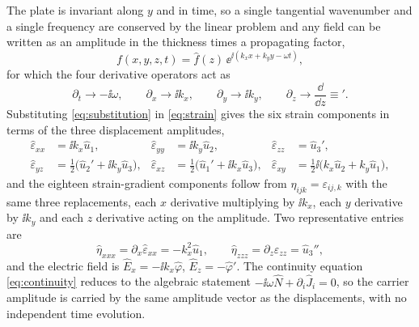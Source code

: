 The plate is invariant along $y$ and in time, so a single tangential wavenumber
and a single frequency are conserved by the linear problem and any field can be written as an amplitude in the thickness times a propagating factor,
\begin{equation}
\label{eq:ansatz}
f(x,y,z,t)=\widehat f(z)\,\ee^{\ii(k_xx+k_yy-\omega t)} ,
\end{equation}
for which the four derivative operators act as
\begin{equation}
\label{eq:substitution}
\partial_t\to-\ii\omega,\qquad
\partial_x\to\ii k_x,\qquad
\partial_y\to\ii k_y,\qquad
\partial_z\to\frac{\dd}{\dd z}\equiv{}' .
\end{equation}
Substituting \eqref{eq:substitution} in \eqref{eq:strain} gives the six strain
components in terms of the three displacement amplitudes,
\begin{equation}
\label{eq:strain_amplitudes}
\begin{aligned}
\widehat\varepsilon_{xx}&=\ii k_x\widehat u_1, &
\widehat\varepsilon_{yy}&=\ii k_y\widehat u_2, &
\widehat\varepsilon_{zz}&=\widehat u_3',\\
\widehat\varepsilon_{yz}&=\tfrac12\bigl(\widehat u_2'+\ii k_y\widehat u_3\bigr),&
\widehat\varepsilon_{xz}&=\tfrac12\bigl(\widehat u_1'+\ii k_x\widehat u_3\bigr),&
\widehat\varepsilon_{xy}&=\tfrac12\ii\bigl(k_x\widehat u_2+k_y\widehat u_1\bigr),
\end{aligned}
\end{equation}
and the eighteen strain-gradient components follow from
$\eta_{ijk}=\varepsilon_{ij,k}$ with the same three replacements, each $x$
derivative multiplying by $\ii k_x$, each $y$ derivative by $\ii k_y$ and each
$z$ derivative acting on the amplitude.  Two representative entries are
\begin{equation}
\label{eq:eta_amplitudes}
\widehat\eta_{xxx}=\partial_x\widehat\varepsilon_{xx}=-k_x^{2}\widehat u_1,
\qquad
\widehat\eta_{zzz}=\partial_z\widehat\varepsilon_{zz}=\widehat u_3'',
\end{equation}
and the electric field is $\widehat E_x=-\ii k_x\widehat\varphi$,
$\widehat E_z=-\widehat\varphi'$.  The continuity equation
\eqref{eq:continuity} reduces to the algebraic statement
$-\ii\omega\widehat N+\partial_i\widehat J_i=0$, so the carrier amplitude is
carried by the same amplitude vector as the displacements, with no independent time evolution.

